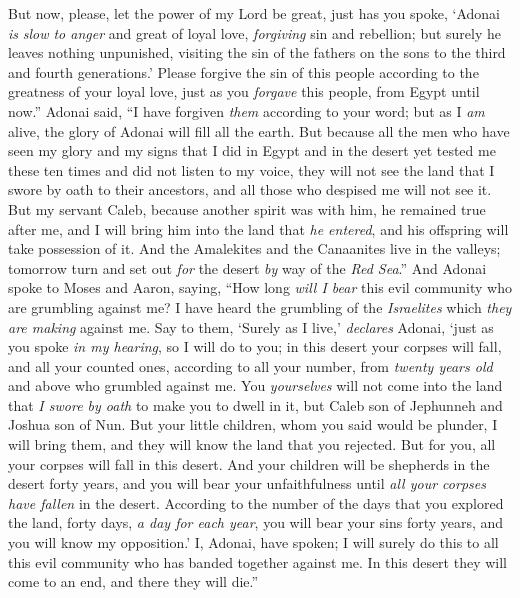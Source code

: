 \begin{biblechapter}
\verse But now, please, let the power of my Lord be great, just has you spoke,
\verse ‘Adonai \textit{is} \textit{slow to anger} 
and great of loyal love, 
\textit{forgiving} sin and rebellion; 
but surely he leaves nothing unpunished, 
visiting the sin of the fathers on the sons 
to the third and fourth generations.’
\verse Please forgive the sin of this people according to the greatness of your loyal love, just as you \textit{forgave} this people, from Egypt until now.”
\verse Adonai said, “I have forgiven \textit{them} according to your word;
\verse but as I \textit{am} alive, the glory of Adonai will fill all the earth.
\verse But because all the men who have seen my glory and my signs that I did in Egypt and in the desert yet tested me these ten times and did not listen to my voice,
\verse they will not see the land that I swore by oath to their ancestors, and all those who despised me will not see it.
\verse But my servant Caleb, because another spirit was with him, he remained true after me, and I will bring him into the land that \textit{he entered}, and his offspring will take possession of it.
\verse And the Amalekites and the Canaanites live in the valleys; tomorrow turn and set out \textit{for} the desert \textit{by} way of the \textit{Red Sea}.”
\verse And Adonai spoke to Moses and Aaron, saying,
\verse “How long \textit{will I bear} this evil community who are grumbling against me? I have heard the grumbling of the \textit{Israelites} which \textit{they are making} against me.
\verse Say to them, ‘Surely as I live,’ \textit{declares} Adonai, ‘just as you spoke \textit{in my hearing}, so I will do to you;
\verse in this desert your corpses will fall, and all your counted ones, according to all your number, from \textit{twenty years old} and above who grumbled against me.
\verse You \textit{yourselves} will not come into the land that \textit{I swore by oath} to make you to dwell in it, but Caleb son of Jephunneh and Joshua son of Nun.
\verse But your little children, whom you said would be plunder, I will bring them, and they will know the land that you rejected.
\verse But for you, all your corpses will fall in this desert.
\verse And your children will be shepherds in the desert forty years, and you will bear your unfaithfulness until \textit{all your corpses have fallen} in the desert.
\verse According to the number of the days that you explored the land, forty days, \textit{a day for each year}, you will bear your sins forty years, and you will know my opposition.’
\verse I, Adonai, have spoken; I will surely do this to all this evil community who has banded together against me. In this desert they will come to an end, and there they will die.”

\end{biblechapter}
